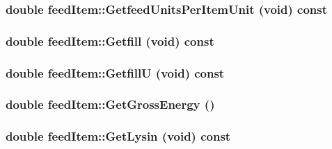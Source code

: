 \label{classfeed_item_a6f91099ccf3f6eb6d80a77d2d7741ae4}
\hypertarget{classfeed_item_a314101a64ec737a5927486a170221354}{
\subsubsection[{GetfeedUnitsPerItemUnit}]{\setlength{\rightskip}{0pt plus 5cm}double feedItem::GetfeedUnitsPerItemUnit (void) const}}
\label{classfeed_item_a314101a64ec737a5927486a170221354}
\hypertarget{classfeed_item_a8cbb0277a129786ec0ab344889f79023}{
\subsubsection[{Getfill}]{\setlength{\rightskip}{0pt plus 5cm}double feedItem::Getfill (void) const}}
\label{classfeed_item_a8cbb0277a129786ec0ab344889f79023}
\hypertarget{classfeed_item_af97130ef91880018163acbc8dbe1e22c}{
\subsubsection[{GetfillU}]{\setlength{\rightskip}{0pt plus 5cm}double feedItem::GetfillU (void) const}}
\label{classfeed_item_af97130ef91880018163acbc8dbe1e22c}
\hypertarget{classfeed_item_af2e734ffbfb0150e8835f00828d100c4}{
\subsubsection[{GetGrossEnergy}]{\setlength{\rightskip}{0pt plus 5cm}double feedItem::GetGrossEnergy ()}}
\label{classfeed_item_af2e734ffbfb0150e8835f00828d100c4}
\hypertarget{classfeed_item_ab371de23a9de676670776b7af72a510f}{
\subsubsection[{GetLysin}]{\setlength{\rightskip}{0pt plus 5cm}double feedItem::GetLysin (void) const}}
